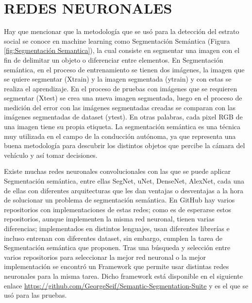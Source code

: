 \section{REDES NEURONALES}
Hay que mencionar que la metodología que se usó para la detección del estrato social se conoce en machine learning como Segmentación Semántica (Figura \ref{fig:Segmentación Semantica}), la cual consiste en segmentar una imagen con el fin de delimitar un objeto o diferenciar entre elementos. En Segmentación semántica, en el proceso de entrenamiento se tienen dos imágenes, la imagen que se quiere segmentar (Xtrain) y la imagen segmentada (ytrain) y con estas se realiza el aprendizaje. En el proceso de pruebas con imágenes que se requieren segmentar (Xtest) se crea una nueva imagen segmentada, luego en el proceso de medición del error con las imágenes segmentadas creadas se comparan con las imágenes segmentadas de dataset (ytest). En otras palabras, cada pixel RGB de una imagen tiene su propia etiqueta. La segmentación semántica es una técnica muy utilizada en el campo de la conducción autónoma, ya que representa una buena metodología para descubrir los distintos objetos que percibe la cámara del vehículo y así tomar decisiones.
  
  
Existe muchas redes neuronales convolucionales con las que se puede aplicar Segmentación semántica, entre ellas SegNet, uNet, DenseNet, AlexNet, cada una de ellas con diferentes arquitecturas que les dan ventajas o desventajas a la hora de solucionar un problema de segmentación semántica. En GitHub hay varios repositorios con implementaciones de estas redes; como es de esperarse estos repositorios, aunque implementen la misma red neuronal, tienen varias diferencias; implementados en distintos lenguajes, usan diferentes librerías e incluso entrenan con diferentes dataset, sin embargo, cumplen la tarea de Segmentación semántica que proponen. Tras una búsqueda y selección entre varios repositorios para seleccionar la mejor red neuronal o la mejor implementación se encontró un Framework que permite usar distintas redes neuronales para la misma tarea. Dicho framework está disponible en el siguiente enlace \url{https://github.com/GeorgeSeif/Semantic-Segmentation-Suite} y es el que se usó para las pruebas.
 
